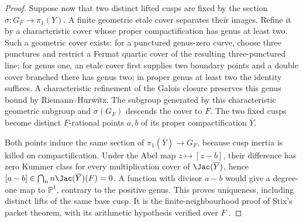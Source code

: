 \begin{proof}
Suppose now that two distinct lifted cusps are fixed by the section
$\sigma:G_F\to\pi_1(Y)$. A finite geometric etale cover separates their
images. Refine it by a characteristic cover whose proper compactification
has genus at least two. Such a geometric cover exists: for a punctured
genus-zero curve, choose three punctures and restrict a Fermat quartic
cover of the resulting three-punctured line;
for genus one, an etale cover first supplies two boundary points and
a double cover branched there has genus two; in proper genus at least two
the identity suffices. A characteristic refinement of the Galois closure
preserves this genus bound by Riemann--Hurwitz. The subgroup generated by
this characteristic geometric subgroup and $\sigma(G_F)$ descends the
cover to $F$. The two fixed cusps become distinct $F$-rational points
$a,b$ of its proper compactification $\overline Y$.

Both points induce the same section of $\pi_1(\overline Y)\to G_F$,
because cusp inertia is killed on compactification. Under the Abel map
$z\mapsto[z-b]$, their difference has zero Kummer class for every
multiplication cover of $\Jac(\overline Y)$, hence
$[a-b]\in\bigcap_n n\Jac(\overline Y)(F)=0$. A function with divisor
$a-b$ would give a degree-one map to $\mathbb P^1$, contrary to the positive
genus. This proves uniqueness, including distinct lifts of the same base
cusp. It is the finite-neighbourhood proof of Stix's packet theorem,
with its arithmetic hypothesis verified over $F$
\citep[Theorem 14 and its proof; Appendix]{CF_Stix2008}.
\end{proof}

